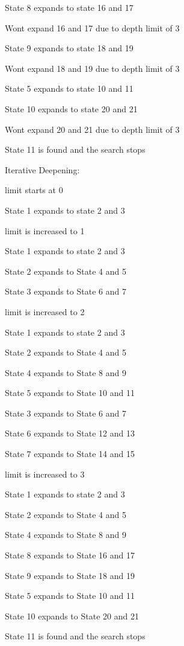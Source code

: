 \documentclass{article}
\begin{document}
State 8 expands to state 16 and 17

Wont expand 16 and 17 due to depth limit of 3

State 9 expands to state 18 and 19

Wont expand 18 and 19 due to depth limit of 3

State 5 expands to state 10 and 11

State 10 expands to state 20 and 21

Wont expand 20 and 21 due to depth limit of 3

State 11 is found and the search stops

\hspace{5mm}

Iterative Deepening:

limit starts at 0

State 1 expands to state 2 and 3
\newline

limit is increased to 1

State 1 expands to state 2 and 3

State 2 expands to State 4 and 5

State 3 expands to State 6 and 7
\newline

limit is increased to 2

State 1 expands to state 2 and 3

State 2 expands to State 4 and 5

State 4 expands to State 8 and 9

State 5 expands to State 10 and 11

State 3 expands to State 6 and 7

State 6 expands to State 12 and 13

State 7 expands to State 14 and 15
\newline

limit is increased to 3

State 1 expands to state 2 and 3

State 2 expands to State 4 and 5

State 4 expands to State 8 and 9

State 8 expands to State 16 and 17

State 9 expands to State 18 and 19

State 5 expands to State 10 and 11

State 10 expands to State 20 and 21

State 11 is found and the search stops
\end{document}
